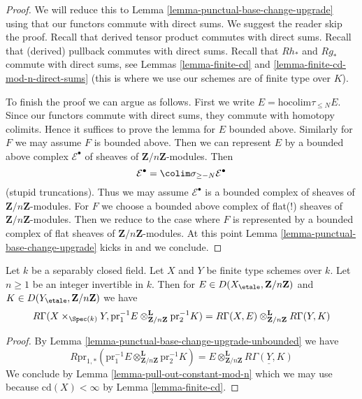 \begin{proof}
We will reduce this to
Lemma \ref{lemma-punctual-base-change-upgrade}
using that our functors commute with direct sums.
We suggest the reader skip the proof.
Recall that derived tensor product commutes with
direct sums. Recall that (derived) pullback commutes with direct sums.
Recall that $Rh_*$ and $Rg_*$ commute with direct sums, see
Lemmas \ref{lemma-finite-cd} and
\ref{lemma-finite-cd-mod-n-direct-sums}
(this is where we use our schemes are of finite type
over $K$).

\medskip\noindent
To finish the proof we can argue as follows.
First we write $E = \text{hocolim} \tau_{\leq N} E$.
Since our functors commute with direct sums, they commute
with homotopy colimits. Hence it suffices to prove
the lemma for $E$ bounded above. Similarly for $F$ we
may assume $F$ is bounded above.
Then we can represent $E$ by a bounded above complex
$\mathcal{E}^\bullet$ of sheaves of $\mathbf{Z}/n\mathbf{Z}$-modules.
Then
$$
\mathcal{E}^\bullet = \colim \sigma_{\geq -N}\mathcal{E}^\bullet
$$
(stupid truncations).
Thus we may assume $\mathcal{E}^\bullet$ is a bounded
complex of sheaves of $\mathbf{Z}/n\mathbf{Z}$-modules.
For $F$ we choose a bounded above complex of
flat(!) sheaves of $\mathbf{Z}/n\mathbf{Z}$-modules.
Then we reduce to the case where $F$ is represented
by a bounded complex of flat sheaves of $\mathbf{Z}/n\mathbf{Z}$-modules.
At this point Lemma \ref{lemma-punctual-base-change-upgrade}
kicks in and we conclude.
\end{proof}

\begin{lemma}
\label{lemma-kunneth}
Let $k$ be a separably closed field. Let $X$ and $Y$ be
finite type schemes over $k$. Let $n \geq 1$ be an integer
invertible in $k$. Then for
$E \in D(X_\etale, \mathbf{Z}/n\mathbf{Z})$ and
$K \in D(Y_\etale, \mathbf{Z}/n\mathbf{Z})$
we have
$$
R\Gamma(X \times_{\Spec(k)} Y,
\text{pr}_1^{-1}E
\otimes_{\mathbf{Z}/n\mathbf{Z}}^\mathbf{L}
\text{pr}_2^{-1}K
)
=
R\Gamma(X, E)
\otimes_{\mathbf{Z}/n\mathbf{Z}}^\mathbf{L}
R\Gamma(Y, K)
$$
\end{lemma}

\begin{proof}
By Lemma \ref{lemma-punctual-base-change-upgrade-unbounded} we have
$$
R\text{pr}_{1, *}(
\text{pr}_1^{-1}E
\otimes_{\mathbf{Z}/n\mathbf{Z}}^\mathbf{L}
\text{pr}_2^{-1}K) =
E \otimes_{\mathbf{Z}/n\mathbf{Z}}^\mathbf{L}
\underline{R\Gamma(Y, K)}
$$
We conclude by
Lemma \ref{lemma-pull-out-constant-mod-n}
which we may use because
$\text{cd}(X) < \infty$ by Lemma \ref{lemma-finite-cd}.
\end{proof}














